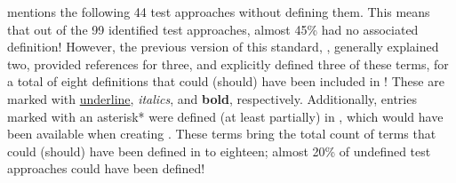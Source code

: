 \citet{IEEE2022} mentions the following 44 test approaches without defining them.
This means that out of the 99 identified test approaches, almost 45\% had no
associated definition!
However, the previous version of this standard, \citep{IEEE2013}, generally
explained two, provided references for three, and explicitly defined three of
these terms, for a total of eight definitions that could (should) have been
included in \citep{IEEE2022}! These are marked with \underline{underline},
\emph{italics}, and \textbf{bold}, respectively. Additionally, entries marked
with an asterisk* were defined (at least partially) in \citep{IEEE2017}, which
would have been available when creating \citep{IEEE2022}. These terms bring the
total count of terms that could (should) have been defined in \citep{IEEE2022}
to eighteen; almost 20\% of undefined test approaches could have been defined!

